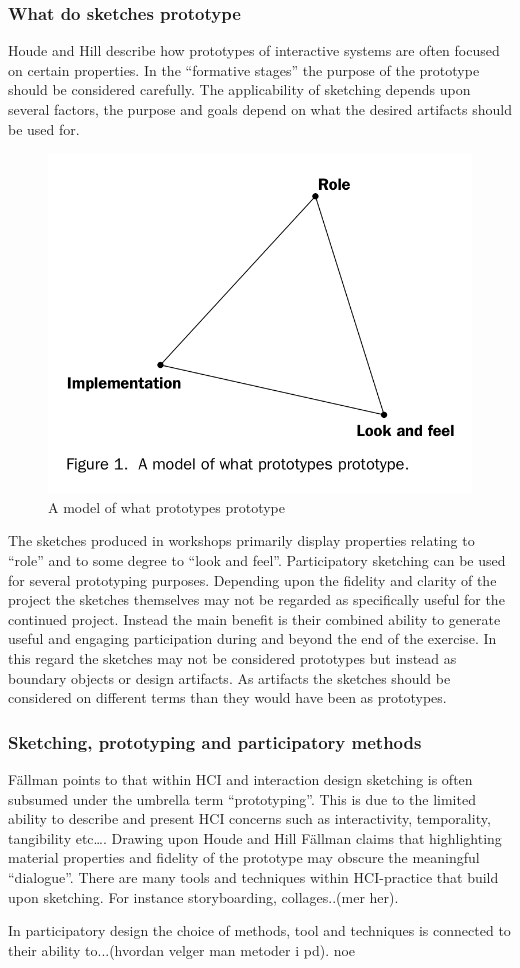 \documentclass[11pt,UKenglish, a4paper]{article}
\begin{document}
\subsubsection*{What do sketches prototype}
Houde and Hill describe how prototypes of interactive systems are often focused on certain properties. In the ``formative stages''\cite[p.1]{Houde1997What} the purpose of the prototype should be considered carefully. The applicability of sketching depends upon several factors, the purpose and goals depend on what the desired artifacts should be used for.

\begin{figure}[HoudeHillPrototypes]
    \centering
	\includegraphics[width=0.5\linewidth]{Images/HoudeHillPrototypes}
    \caption{A model of what prototypes prototype\cite[p.3]{Houde1997What}}
    \label{fig:1}
\end{figure}

The sketches produced in workshops primarily display properties relating to ``role'' and to some degree to ``look and feel''. Participatory sketching can be used for several prototyping purposes. Depending upon the fidelity and clarity of the project the sketches themselves may not be regarded as specifically useful for the continued project. Instead the main benefit is their combined ability to generate useful and engaging participation during and beyond the end of the exercise. In this regard the sketches may not be considered prototypes but instead as boundary objects or design artifacts. As artifacts the sketches should be considered on different terms than they would have been as prototypes. 

\subsubsection*{Sketching, prototyping and participatory methods}
Fällman points to that within HCI and interaction design sketching is often subsumed under the umbrella term ``prototyping''\cite[p.230]{Fallman2003DesignOriented}. This is due to the limited ability to describe and present HCI concerns such as interactivity, temporality, tangibility etc\dots. Drawing upon Houde and Hill\cite[p.]{Houde1997What} Fällman claims that highlighting material properties and fidelity of the prototype may obscure the meaningful ``dialogue''\cite[p.230]{Fallman2003DesignOriented}. There are many tools and techniques within HCI-practice that build upon sketching. For instance storyboarding, collages..(mer her). 

In participatory design the choice of methods, tool and techniques is connected to their ability to...(hvordan velger man metoder i pd).
noe
\printbibliography
\end{document}
